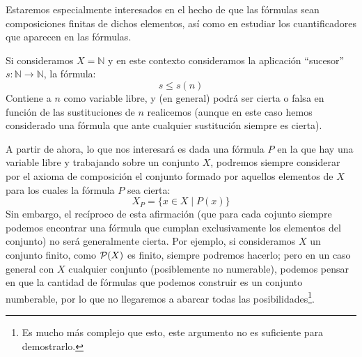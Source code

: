 Estaremos especialmente interesados en el hecho de que las fórmulas sean composiciones finitas de dichos elementos, así como en estudiar los cuantificadores que aparecen en las fórmulas.

\begin{ejemplo}
    Si consideramos $X = \mathbb{N}$ y en este contexto consideramos la aplicación ``sucesor'' $s:\mathbb{N}\to \mathbb{N}$, la fórmula:
    \begin{equation*}
        s\leq s(n)
    \end{equation*}
    Contiene a $n$ como variable libre, y (en general) podrá ser cierta o falsa en función de las sustituciones de $n$ realicemos (aunque en este caso hemos considerado una fórmula que ante cualquier sustitución siempre es cierta).
\end{ejemplo}

A partir de ahora, lo que nos interesará es dada una fórmula $P$ en la que hay una variable libre y trabajando sobre un conjunto $X$, podremos siempre considerar por el axioma de composición el conjunto formado por aquellos elementos de $X$ para los cuales la fórmula $P$ sea cierta:
\begin{equation*}
    X_P = \{x\in X \mid P(x) \}
\end{equation*}
Sin embargo, el recíproco de esta afirmación (que para cada cojunto siempre podemos encontrar una fórmula que cumplan exclusivamente los elementos del conjunto) no será generalmente cierta. Por ejemplo, si consideramos $X$ un conjunto finito, como $\mathcal{P}(X)$ es finito, siempre podremos hacerlo; pero en un caso general con $X$ cualquier conjunto (posiblemente no numerable), podemos pensar en que la cantidad de fórmulas que podemos construir es un conjunto numberable, por lo que no llegaremos a abarcar todas las posibilidades\footnote{Es mucho más complejo que esto, este argumento no es suficiente para demostrarlo.}.


